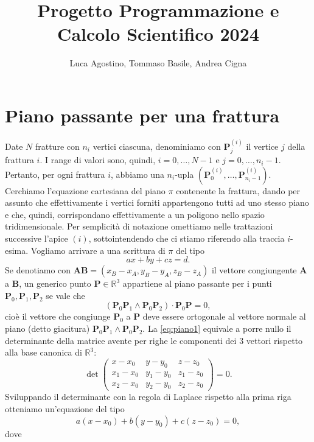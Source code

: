 \documentclass[a4paper]{article}
\title{Progetto Programmazione e Calcolo Scientifico 2024}
\author{Luca Agostino, Tommaso Basile, Andrea Cigna}
\newcommand{\B}{\mathbf}
\begin{document}
\maketitle

\tableofcontents

\section{Piano passante per una frattura}
Date $N$ fratture con $n_i$ vertici ciascuna, denominiamo con $\B{P}^{(i)}_j$ il vertice $j$ della frattura $i$. I range di valori sono, quindi, $i=0,\dots,N-1$ e $j=0,\dots,n_i-1$. Pertanto, per ogni frattura $i$, abbiamo una $n_i$-upla $(\B{P}^{(i)}_0,\dots,\B{P}^{(i)}_{n_i-1})$. Cerchiamo l'equazione cartesiana del piano $\pi$ contenente la frattura, dando per assunto che effettivamente i vertici forniti appartengono tutti ad uno stesso piano e che, quindi, corrispondano effettivamente a un poligono nello spazio tridimensionale. Per semplicità di notazione omettiamo nelle trattazioni successive l'apice $(i)$, sottointendendo che ci stiamo riferendo alla traccia $i$-esima. Vogliamo arrivare a una scrittura di $\pi$ del tipo $$ax+by+cz=d.$$
Se denotiamo con ${\B{A}\B{B}}=(x_B-x_A,y_B-y_A,z_B-z_A)$ il vettore congiungente $\B{A}$ a $\B{B}$, un generico punto $\B{P}\in\mathbb{R}^3$ appartiene al piano passante per i punti $\B{P}_0,\B{P}_1,\B{P}_2$ se vale che 
\begin{equation}\label{eq:piano1}
(\B{P}_0\B{P}_1\wedge \B{P}_0\B{P}_2)\cdot \B{P}_0\B{P}=0,
\end{equation} 
cioè il vettore che congiunge $\B{P}_0$ a $\B{P}$ deve essere ortogonale al vettore normale al piano (detto giacitura) $\B{P}_0\B{P}_1\wedge \B{P}_0\B{P}_2$. 
La \eqref{eq:piano1} equivale a porre nullo il determinante della matrice avente per righe le componenti dei $3$ vettori rispetto alla base canonica di $\mathbb{R}^3$: 
$$
\det\begin{pmatrix} x-x_0 & y-y_0 & z-z_0 \\ x_1-x_0 & y_1-y_0 & z_1-z_0 \\x_2-x_0 & y_2-y_0 & z_2-z_0 \end{pmatrix}=0.
$$
Sviluppando il determinante con la regola di Laplace rispetto alla prima riga otteniamo un'equazione del tipo 
\begin{equation}\label{eq:piano2}
a\left(x-x_0\right)+b\left(y-y_0\right)+c\left(z-z_0\right)=0,
\end{equation} 
dove 
\end{document}

